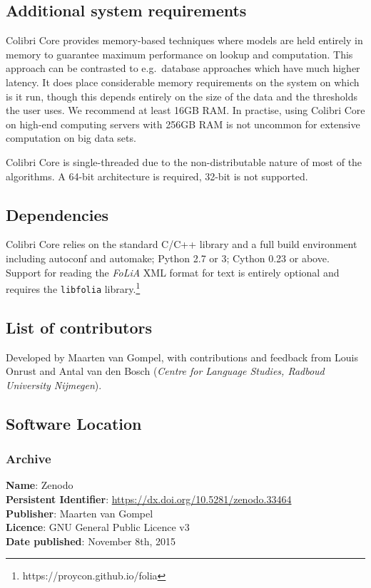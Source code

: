 \documentclass[a4paper,12pt]{article}
\begin{document}
\subsection{Additional system requirements}

Colibri Core provides memory-based techniques where models are held entirely in
memory to guarantee maximum performance on lookup and computation.  This
approach can be contrasted to e.g.\ database approaches which have much higher
latency.  It does place considerable memory requirements on the system on which
is it run, though this depends entirely on the size of the data and the
thresholds the user uses. We recommend at least 16GB RAM. In practise, using Colibri
Core on high-end computing servers with 256GB RAM is not uncommon for extensive
computation on big data sets.

Colibri Core is single-threaded due to the non-distributable nature of most of the
algorithms. A 64-bit architecture is required, 32-bit is not supported.

\subsection{Dependencies}

Colibri Core relies on the standard C/C++ library and a full build environment including autoconf and
automake; Python 2.7 or 3; Cython 0.23 or above. Support for reading the
\emph{FoLiA} XML format for text is entirely optional and requires the \texttt{libfolia}
library.\footnote{https://proycon.github.io/folia}

\subsection{List of contributors}

Developed by Maarten van Gompel, with contributions and feedback from Louis
Onrust and Antal van den Bosch (\emph{Centre for Language Studies, Radboud
University Nijmegen}).

\subsection{Software Location}

\subsubsection{Archive}

\begin{addmargin}[2em]{2em}
\textbf{Name}: Zenodo \\
\textbf{Persistent Identifier}: \url{https://dx.doi.org/10.5281/zenodo.33464} \\
\textbf{Publisher}: Maarten van Gompel \\
\textbf{Licence}: GNU General Public Licence v3 \\
\textbf{Date published}: November 8th, 2015 \\
\end{addmargin}
\end{document}
